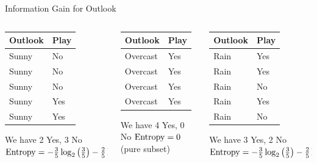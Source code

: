\documentclass[usenames,dvipsnames]{beamer}
\begin{document}
\begin{frame}{Information Gain for Outlook}
\begin{columns}


\begin{column}{.32\textwidth}
	\begin{table}
\begin{tabular}{l|l} \toprule
	\textbf{Outlook} & \textbf{Play} \\ \midrule
	Sunny    & No   \\
	Sunny    & No   \\
	Sunny    & No   \\
	Sunny    & Yes  \\
	Sunny    & Yes  \\

\bottomrule
\end{tabular}
We have 2 Yes, 3 No
$\operatorname{Entropy} = -\frac{3}{5} \log_2\left(\frac{3}{5}\right) - \frac{2}{5} \log_2\left(\frac{2}{5}\right) = 0.971$
\end{table}
\end{column}

\pause \begin{column}{.32\textwidth}
	\begin{table}


\begin{tabular}{l|l} \toprule
	\textbf{Outlook} & \textbf{Play} \\ \midrule

	Overcast & Yes  \\
	Overcast & Yes  \\
	Overcast & Yes  \\
	Overcast & Yes  \\ \bottomrule

\end{tabular}
We have 4 Yes, 0 No
$\operatorname{Entropy} = 0$ (pure subset)


	\end{table}


\end{column}


\pause \begin{column}{.32\textwidth}
	\begin{table}
\begin{tabular}{l|l} \toprule
	\textbf{Outlook} & \textbf{Play} \\ \midrule
	Rain     & Yes  \\
	Rain     & Yes  \\
	Rain     & No   \\
	Rain     & Yes  \\
	Rain     & No  \\ \bottomrule
\end{tabular}
We have 3 Yes, 2 No
$\operatorname{Entropy} = -\frac{3}{5} \log_2\left(\frac{3}{5}\right) - \frac{2}{5} \log_2\left(\frac{2}{5}\right) = 0.971$
\end{table}
\end{column}
\end{columns}
\end{frame}
\end{document}
